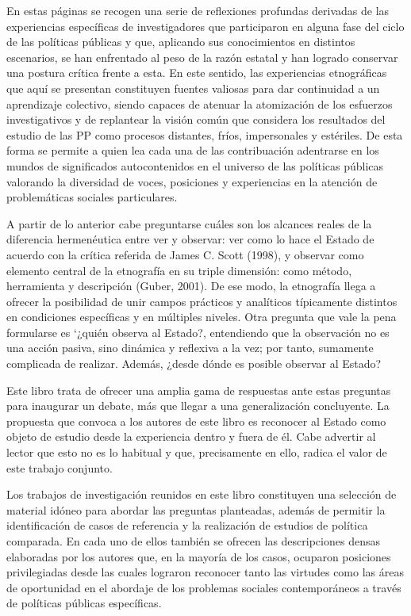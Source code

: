 \documentclass[
  spanish,
  11pt,
  a4paper,
]{scrbook}
\begin{document}
En estas páginas se recogen una serie de reflexiones profundas derivadas
de las experiencias específicas de investigadores que participaron en
alguna fase del ciclo de las políticas públicas y que, aplicando sus
conocimientos en distintos escenarios, se han enfrentado al peso de la
razón estatal y han logrado conservar una postura crítica frente a esta.
En este sentido, las experiencias etnográficas que aquí se presentan
constituyen fuentes valiosas para dar continuidad a un aprendizaje
colectivo, siendo capaces de atenuar la atomización de los esfuerzos
investigativos y de replantear la visión común que considera los
resultados del estudio de las PP como procesos distantes, fríos,
impersonales y estériles. De esta forma se permite a quien lea cada una
de las contribuación adentrarse en los mundos de significados
autocontenidos en el universo de las políticas públicas valorando la
diversidad de voces, posiciones y experiencias en la atención de
problemáticas sociales particulares.

A partir de lo anterior cabe preguntarse cuáles son los alcances reales
de la diferencia hermenéutica entre ver y observar: ver como lo hace el
Estado de acuerdo con la crítica referida de James C. Scott (1998), y
observar como elemento central de la etnografía en su triple dimensión:
como método, herramienta y descripción (Guber, 2001). De ese modo, la
etnografía llega a ofrecer la posibilidad de unir campos prácticos y
analíticos típicamente distintos en condiciones específicas y en
múltiples niveles. Otra pregunta que vale la pena formularse es `¿quién
observa al Estado?, entendiendo que la observación no es una acción
pasiva, sino dinámica y reflexiva a la vez; por tanto, sumamente
complicada de realizar. Además, ¿desde dónde es posible observar al
Estado?

Este libro trata de ofrecer una amplia gama de respuestas ante estas
preguntas para inaugurar un debate, más que llegar a una generalización
concluyente. La propuesta que convoca a los autores de este libro es
reconocer al Estado como objeto de estudio desde la experiencia dentro y
fuera de él. Cabe advertir al lector que esto no es lo habitual y que,
precisamente en ello, radica el valor de este trabajo conjunto.

\vspace*{.5cm}

Los trabajos de investigación reunidos en este libro constituyen una
selección de material idóneo para abordar las preguntas planteadas,
además de permitir la identificación de casos de referencia y la
realización de estudios de política comparada. En cada uno de ellos
también se ofrecen las descripciones densas elaboradas por los autores
que, en la mayoría de los casos, ocuparon posiciones privilegiadas desde
las cuales lograron reconocer tanto las virtudes como las áreas de
oportunidad en el abordaje de los problemas sociales contemporáneos a
través de políticas públicas específicas.
\end{document}
